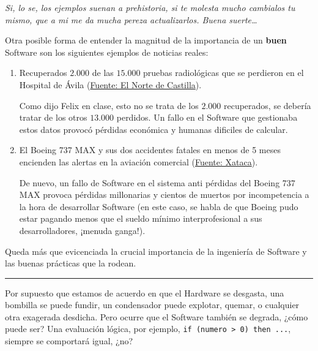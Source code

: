 \small\textit{Si, lo se, los ejemplos suenan a prehistoria, si te molesta mucho cambialos tu mismo, que a mi me da
mucha pereza actualizarlos. Buena suerte\dots}

\vspace*{2mm}

Otra posible forma de entender la magnitud de la importancia de un \textbf{buen} Software son los siguientes 
ejemplos de noticias reales:

\begin{enumerate}
    \item Recuperados $2.000$ de las $15.000$ pruebas radiológicas que se perdieron en el Hospital de Ávila
    (\href{https://www.elnortedecastilla.es/avila/201602/01/recuperados-pruebas-radiologicas-perdieron-20160201193859.html}{Fuente: El Norte de Castilla}).

    Como dijo Felix en clase, esto no se trata de los $2.000$ recuperados, se debería tratar de los otros $13.000$
    perdidos. Un fallo en el Software que gestionaba estos datos provocó pérdidas económica y humanas dificiles de 
    calcular.

    \item El Boeing 737 MAX y sus dos accidentes fatales en menos de 5 meses encienden las alertas en la aviación 
    comercial (\href{https://www.xataka.com/vehiculos/avion-boeing-737-max-sus-dos-accidentes-fatales-cinco-meses-encienden-alertas-aviacion-comercial}{Fuente: Xataca}).

    De nuevo, un fallo de Software en el sistema anti pérdidas del Boeing 737 MAX provoca pérdidas millonarias y 
    cientos de muertos por incompetencia a la hora de desarrollar Software (en este caso, se habla de que Boeing
    pudo estar pagando menos que el sueldo mínimo interprofesional a sus desarrolladores, ¡menuda ganga!). 
\end{enumerate}

\noindent Queda más que evicenciada la crucial importancia de la ingeniería de Software y las buenas prácticas que
la rodean.

\vspace*{2mm}

\noindent\rule{\textwidth}{0.4pt}

\vfil

Por supuesto que estamos de acuerdo en que el Hardware se desgasta, una bombilla se puede fundir, un condensador puede
explotar, quemar, o cualquier otra exagerada desdicha. Pero ocurre que el Software también se degrada, ¿cómo puede
ser? Una evaluación lógica, por ejemplo, \lstinline{if (numero > 0) then ...}, siempre se comportará igual, ¿no? %

